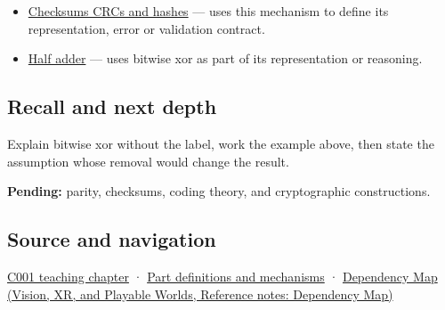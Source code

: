 \begin{itemize}
\item
  \hyperref[appendix-ed338677de0a]{Checksums CRCs and hashes} --- uses this mechanism to define its representation, error or validation contract.
\item
  \hyperref[appendix-1652d27a8e90]{Half adder} --- uses bitwise xor as part of its representation or reasoning.
\end{itemize}

\subsection{Recall and next depth}\label{appendix-d49161831368-recall-and-next-depth}

\hypertarget{appendix-d49161831368-recall-and-next-depth}{}

Explain bitwise xor without the label, work the example above, then state the assumption whose removal would change the result.

\textbf{Pending:} parity, checksums, coding theory, and cryptographic constructions.

\subsection{Source and navigation}\label{appendix-d49161831368-source-and-navigation}

\hypertarget{appendix-d49161831368-source-and-navigation}{}

\hyperref[01-foundations-i-ch001-from-a-signal-to-an-interpretation]{C001 teaching chapter} · \hyperref[appendix-fd090d982a15]{Part definitions and mechanisms} · \href{../07-Vision-XR-and-Playable-Worlds/main.pdf\#nameddest=appendix-4ad47bdd269a}{Dependency Map (Vision, XR, and Playable Worlds, Reference notes: Dependency Map)}
